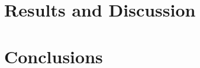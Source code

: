 \section{Results and Discussion}


\section{Conclusions}





\clearpage

 \renewcommand\bibname{REFERENCES}
%   
   
  \clearpage
  \newpage
